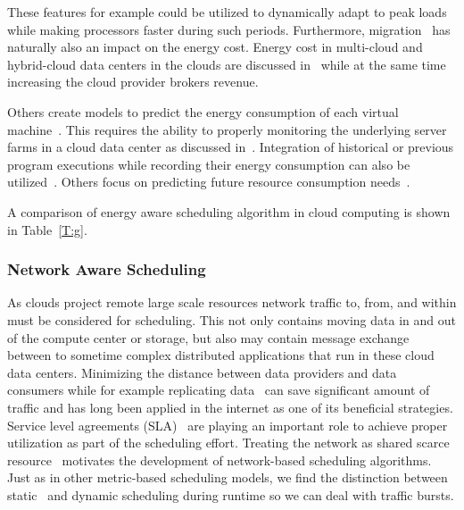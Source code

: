 \documentclass[final,5p,times,twocolumn]{elsarticle}
\begin{document}
These features for example could be utilized to dynamically adapt to
peak loads~\cite{duan2016energy} while making processors faster during
such periods.  Furthermore, migration~\cite{beloglazov2010energy} has
naturally also an impact on the energy cost.  Energy cost in
multi-cloud and hybrid-cloud data centers in the clouds are discussed
in~\cite{quarati2013hybrid,garg2011environment,gai2016dynamic,2015energy} while
at the same time increasing the cloud provider brokers revenue.


Others create models to predict the energy consumption of each virtual
machine~\cite{kim2014energy}. This requires the ability to properly
monitoring the underlying server farms in a cloud data center as
discussed in~\cite{van2012comparison}. Integration of historical or
previous program executions while recording their energy consumption
can also be utilized~\cite{hu2010scheduling}. Others focus on
predicting future resource consumption needs~\cite{dabbagh2015energy}.

A comparison of energy aware scheduling algorithm in cloud computing is shown in
Table~\ref{T:g}.





\subsubsection{Network Aware Scheduling}\label{sec:network}




As clouds project remote large scale resources network traffic to,
from, and within must be considered for scheduling. This not only
contains moving data in and out of the compute center or storage, but
also may contain message exchange between to sometime complex
distributed applications that run in these cloud data
centers. Minimizing the distance between data providers and data
consumers while for example replicating data~\cite{www-akamai} can save
significant amount of traffic and has long been applied in the
internet as one of its beneficial strategies. Service level agreements
(SLA)~\cite{breitgand2012improving} are playing an important role to
achieve proper utilization as part of the scheduling effort. Treating
the network as shared scarce resource~\cite{rampersaud2016sharing}
motivates the development of network-based scheduling algorithms.
Just as in other metric-based scheduling models, we find the
distinction between static~\cite{biran2012stable} and dynamic
scheduling during runtime so we can deal with traffic bursts.
\end{document}
